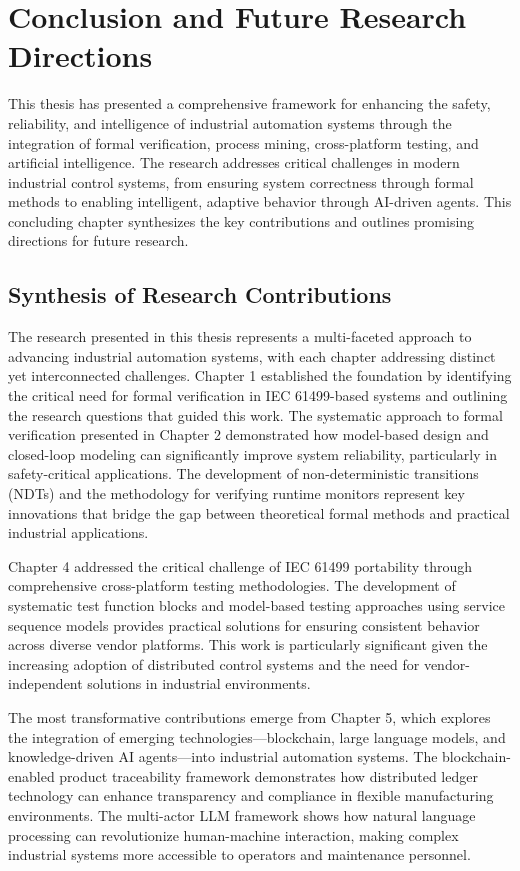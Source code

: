 \section{Conclusion and Future Research Directions}

This thesis has presented a comprehensive framework for enhancing the safety, reliability, and intelligence of industrial automation systems through the integration of formal verification, process mining, cross-platform testing, and artificial intelligence. The research addresses critical challenges in modern industrial control systems, from ensuring system correctness through formal methods to enabling intelligent, adaptive behavior through AI-driven agents. This concluding chapter synthesizes the key contributions and outlines promising directions for future research.

\subsection{Synthesis of Research Contributions}

The research presented in this thesis represents a multi-faceted approach to advancing industrial automation systems, with each chapter addressing distinct yet interconnected challenges. Chapter 1 established the foundation by identifying the critical need for formal verification in IEC 61499-based systems and outlining the research questions that guided this work. The systematic approach to formal verification presented in Chapter 2 demonstrated how model-based design and closed-loop modeling can significantly improve system reliability, particularly in safety-critical applications. The development of non-deterministic transitions (NDTs) and the methodology for verifying runtime monitors represent key innovations that bridge the gap between theoretical formal methods and practical industrial applications.

Chapter 4 addressed the critical challenge of IEC 61499 portability through comprehensive cross-platform testing methodologies. The development of systematic test function blocks and model-based testing approaches using service sequence models provides practical solutions for ensuring consistent behavior across diverse vendor platforms. This work is particularly significant given the increasing adoption of distributed control systems and the need for vendor-independent solutions in industrial environments.

The most transformative contributions emerge from Chapter 5, which explores the integration of emerging technologies—blockchain, large language models, and knowledge-driven AI agents—into industrial automation systems. The blockchain-enabled product traceability framework demonstrates how distributed ledger technology can enhance transparency and compliance in flexible manufacturing environments. The multi-actor LLM framework shows how natural language processing can revolutionize human-machine interaction, making complex industrial systems more accessible to operators and maintenance personnel.

